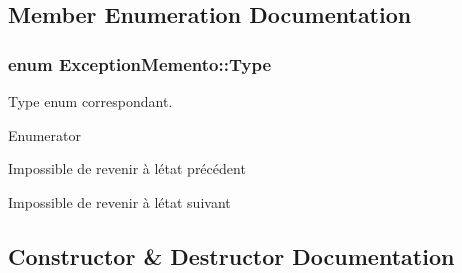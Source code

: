 \subsection{Member Enumeration Documentation}
\subsubsection[{\texorpdfstring{Type}{Type}}]{\setlength{\rightskip}{0pt plus 5cm}enum {\bf Exception\+Memento\+::\+Type}}\hypertarget{class_exception_memento_a83ec20464c7ba61569afeb4477f1504e}{}\label{class_exception_memento_a83ec20464c7ba61569afeb4477f1504e}


Type enum correspondant. 

\begin{Desc}
\item[Enumerator]\par
\begin{description}
\item[{\em 
C\+A\+N\+N\+O\+T\+\_\+\+U\+N\+DO\hypertarget{class_exception_memento_a83ec20464c7ba61569afeb4477f1504ea9f16db6c0e64e2a901a245fdf853058a}{}\label{class_exception_memento_a83ec20464c7ba61569afeb4477f1504ea9f16db6c0e64e2a901a245fdf853058a}
}]Impossible de revenir à l\textquotesingle{}état précédent \item[{\em 
C\+A\+N\+N\+O\+T\+\_\+\+R\+E\+DO\hypertarget{class_exception_memento_a83ec20464c7ba61569afeb4477f1504eae5de90f573b1df7d52ef3c32bf80f4b5}{}\label{class_exception_memento_a83ec20464c7ba61569afeb4477f1504eae5de90f573b1df7d52ef3c32bf80f4b5}
}]Impossible de revenir à l\textquotesingle{}état suivant \end{description}
\end{Desc}


\subsection{Constructor \& Destructor Documentation}
